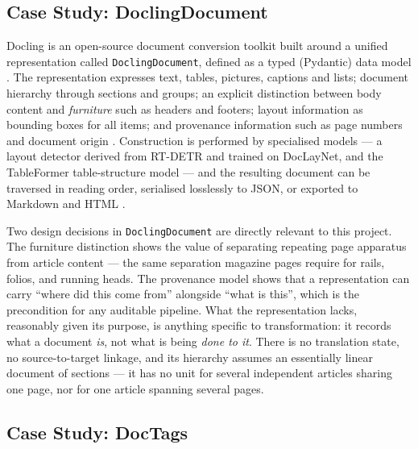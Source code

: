 \subsection{Case Study: DoclingDocument}

Docling is an open-source document conversion toolkit built around a
unified representation called \texttt{DoclingDocument}, defined as a
typed (Pydantic) data model \cite{docling2025}. The representation
expresses text, tables, pictures, captions and lists; document
hierarchy through sections and groups; an explicit distinction between
body content and \emph{furniture} such as headers and footers; layout
information as bounding boxes for all items; and provenance information
such as page numbers and document origin \cite{docling2025}.
Construction is performed by specialised models --- a layout detector
derived from RT-DETR and trained on DocLayNet, and the TableFormer
table-structure model --- and the resulting document can be traversed
in reading order, serialised losslessly to JSON, or exported to
Markdown and HTML \cite{docling2025}.

Two design decisions in \texttt{DoclingDocument} are directly relevant
to this project. The furniture distinction shows the value of
separating repeating page apparatus from article content --- the same
separation magazine pages require for rails, folios, and running heads.
The provenance model shows that a representation can carry ``where did
this come from'' alongside ``what is this'', which is the precondition
for any auditable pipeline. What the representation lacks, reasonably
given its purpose, is anything specific to transformation: it records
what a document \emph{is}, not what is being \emph{done to it}. There
is no translation state, no source-to-target linkage, and its hierarchy
assumes an essentially linear document of sections --- it has no unit
for several independent articles sharing one page, nor for one article
spanning several pages.

\subsection{Case Study: DocTags}

